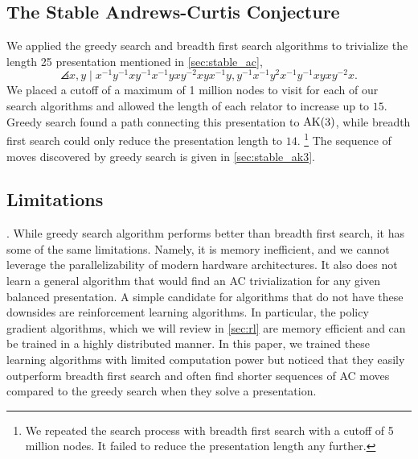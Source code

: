 \subsection{The Stable Andrews-Curtis Conjecture}
We applied the greedy search and breadth first search algorithms to trivialize the length 25 presentation mentioned in \autoref{sec:stable_ac},
\[
\angles{ x, y \mid 
x^{-1}y^{-1}xy^{-1}x^{-1}yxy^{-2}xyx^{-1}y, 
y^{-1}x^{-1}y^2x^{-1}y^{-1}xyxy^{-2}x }.
\]
We placed a cutoff of a maximum of 1 million nodes to visit for each of our search algorithms and allowed the length of each relator to increase up to $15$. Greedy search found a path connecting this presentation to $\text{AK}(3)$, while breadth first search could only reduce the presentation length to $14$. 
\footnote{We repeated the search process with breadth first search with a cutoff of 5 million nodes. It failed to reduce the presentation length any further.}
The sequence of moves discovered by greedy search is given in \autoref{sec:stable_ak3}.

\subsection{Limitations}. While greedy search algorithm performs better than breadth first search, it has some of the same limitations. Namely, it is memory inefficient, and we cannot leverage the parallelizability of modern hardware architectures. It also does not learn a general algorithm that would find an AC trivialization for any given balanced presentation. A simple candidate for algorithms that do not have these downsides are reinforcement learning algorithms. In particular, the policy gradient algorithms, which we will review in \autoref{sec:rl} are memory efficient and can be trained in a highly distributed manner. In this paper, we trained these learning algorithms with limited computation power but noticed that they easily outperform breadth first search and often find shorter sequences of AC moves compared to the greedy search when they solve a presentation. 
